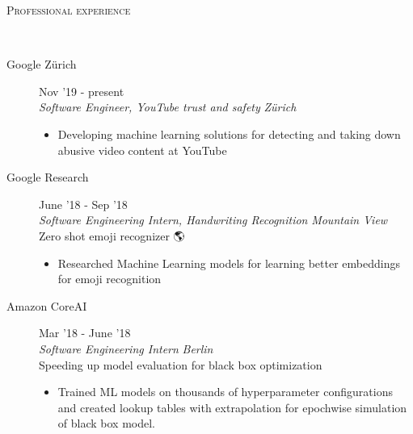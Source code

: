 \documentclass[9pt]{article}
\newenvironment{changemargin}[2]{%
  \begin{list}{}{%
      \setlength{\topsep}{0pt}%
    \setlength{\leftmargin}{#1}%
    \setlength{\rightmargin}{#2}%
    \setlength{\listparindent}{\parindent}%
  \setlength{\itemindent}{\parindent}%
    \setlength{\parsep}{\parskip}%
    }%
  \item[]}{\end{list}
    }
\newcommand{\lineover}{
  \begin{changemargin}{-0.05in}{-0.10in}
    \vspace*{-9pt}
    \hrulefill \\
    \vspace*{-2pt}
  \end{changemargin}
}
\newcommand{\header}[1]{
  \begin{changemargin}{-0.5in}{-0.5in}
    \scshape{#1}\\
        \lineover
  \end{changemargin}
}
\newenvironment{body} {
  \vspace*{-16pt}
        \begin{changemargin}{-0.6in}{-0.65in}
        }	
        {\end{changemargin}
}
\begin{document}
\vspace{3mm}
\header{Professional experience}
\begin{body}
  \vspace{14pt}
 
  \begin{description}
    \item[\normalsize{Google Z{\"u}rich}] \hfill {Nov '19 - present} \\
      \textit{Software Engineer, YouTube trust and safety} \hfill \textit{Z{\"u}rich} \\
      \begin{itemize}
      \item Developing machine learning solutions for detecting and taking down abusive video content at YouTube
      \end{itemize}
  \end{description}

  \begin{description}
    \item[Google Research] \hfill {June '18 - Sep '18} \\
    \textit{Software Engineering Intern, Handwriting Recognition} \hfill \textit{Mountain View}\\
  \normalsize{Zero shot emoji recognizer}  🌎
  \begin{itemize}
    \item Researched Machine Learning models for learning better embeddings for emoji recognition
  \end{itemize}
 \end{description}

  \begin{description}
    \item[Amazon CoreAI] \hfill {Mar '18 - June '18} \\
      \textit{Software Engineering Intern} \hfill \textit{Berlin} \\
      \normalsize{Speeding up model evaluation for black box optimization}
      \begin{itemize}
        \item Trained ML models on thousands of hyperparameter configurations and created lookup tables with extrapolation for epochwise simulation of black box model.
      \end{itemize}


\end{description}
\end{body}
\end{document}
